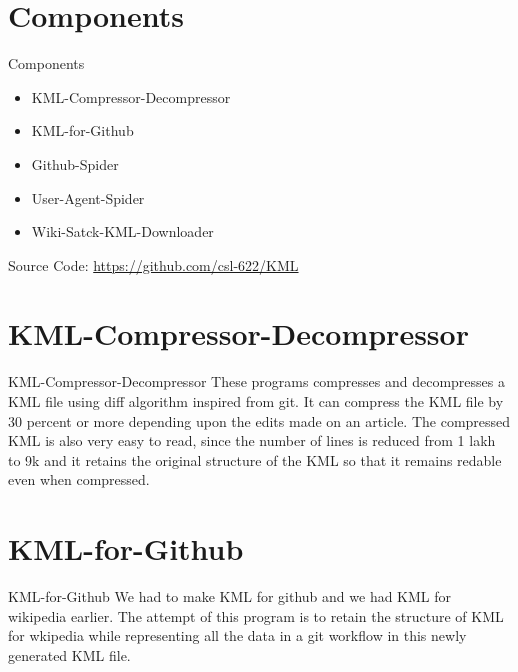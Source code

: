 \documentclass[handout,t]{beamer}
\begin{document}
\section{Components}
\begin{frame}{Components}
  \begin{itemize}
    \item KML-Compressor-Decompressor
    \item KML-for-Github
    \item Github-Spider
    \item User-Agent-Spider
    \item Wiki-Satck-KML-Downloader
  \end{itemize}
\bigskip
Source Code: \url{https://github.com/csl-622/KML}  
  
\end{frame}

\section{KML-Compressor-Decompressor}
\begin{frame}{KML-Compressor-Decompressor}
These programs compresses and decompresses a KML file using diff algorithm inspired from git. It can compress the KML file by 30 percent or more depending upon the edits made on an article. The compressed KML is also very easy to read, since the number of lines is reduced from 1 lakh to 9k and it retains the original structure of the KML so that it remains redable even when compressed.\end{frame}

\section{KML-for-Github}
\begin{frame}{KML-for-Github}
We had to make KML for github and we had KML for wikipedia earlier. The attempt of this program is to retain the structure of KML for wkipedia while representing all the data in a git workflow in this newly generated KML file.\end{frame}
\end{document}
